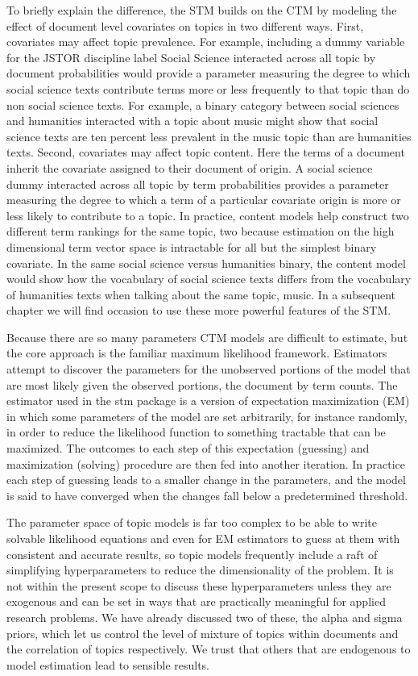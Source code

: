 \documentclass[]{book}
\theoremstyle{definition}
\theoremstyle{definition}
\theoremstyle{definition}
\theoremstyle{remark}
\begin{document}
To briefly explain the difference, the STM builds on the CTM by modeling
the effect of document level covariates on topics in two different ways.
First, covariates may affect topic prevalence. For example, including a
dummy variable for the JSTOR discipline label Social Science interacted
across all topic by document probabilities would provide a parameter
measuring the degree to which social science texts contribute terms more
or less frequently to that topic than do non social science texts. For
example, a binary category between social sciences and humanities
interacted with a topic about music might show that social science texts
are ten percent less prevalent in the music topic than are humanities
texts. Second, covariates may affect topic content. Here the terms of a
document inherit the covariate assigned to their document of origin. A
social science dummy interacted across all topic by term probabilities
provides a parameter measuring the degree to which a term of a
particular covariate origin is more or less likely to contribute to a
topic. In practice, content models help construct two different term
rankings for the same topic, two because estimation on the high
dimensional term vector space is intractable for all but the simplest
binary covariate. In the same social science versus humanities binary,
the content model would show how the vocabulary of social science texts
differs from the vocabulary of humanities texts when talking about the
same topic, music. In a subsequent chapter we will find occasion to use
these more powerful features of the STM.

Because there are so many parameters CTM models are difficult to
estimate, but the core approach is the familiar maximum likelihood
framework. Estimators attempt to discover the parameters for the
unobserved portions of the model that are most likely given the observed
portions, the document by term counts. The estimator used in the stm
package is a version of expectation maximization (EM) in which some
parameters of the model are set arbitrarily, for instance randomly, in
order to reduce the likelihood function to something tractable that can
be maximized. The outcomes to each step of this expectation (guessing)
and maximization (solving) procedure are then fed into another
iteration. In practice each step of guessing leads to a smaller change
in the parameters, and the model is said to have converged when the
changes fall below a predetermined threshold.

The parameter space of topic models is far too complex to be able to
write solvable likelihood equations and even for EM estimators to guess
at them with consistent and accurate results, so topic models frequently
include a raft of simplifying hyperparameters to reduce the
dimensionality of the problem. It is not within the present scope to
discuss these hyperparameters unless they are exogenous and can be set
in ways that are practically meaningful for applied research problems.
We have already discussed two of these, the alpha and sigma priors,
which let us control the level of mixture of topics within documents and
the correlation of topics respectively. We trust that others that are
endogenous to model estimation lead to sensible results.
\end{document}
